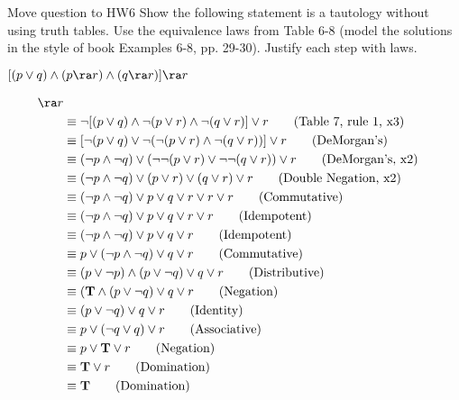 \begin{questions}


	
 {\color{red} Move question to HW6}
Show the following statement is a tautology without using truth tables. Use the equivalence laws from Table 6-8 (model the solutions in the style of book Examples 6-8, pp. 29-30).  Justify each step with laws.

\vspace{-0.15in}
\begin{center}
    $[(p \vee q) \wedge (p \ra r) \wedge (q \ra r)] \ra r$
\end{center}
\vspace{-10pt}

    \begin{solution}
    \begin{align*}
      [(p \vee q) &\wedge ((p \ra r) \wedge (q \ra r))] \ra r \\
      &\equiv \neg[(p \vee q) \wedge \neg(p \vee r) \wedge \neg (q \vee r)] \vee r \tag{Table 7, rule 1, x3} \\
      &\equiv [\neg(p \vee q) \vee \neg(\neg(p \vee r) \wedge \neg(q \vee r))] \vee r \tag{DeMorgan's} \\
      & \equiv (\neg p \wedge \neg q) \vee (\neg \neg(p \vee r) \vee \neg \neg(q \vee r)) \vee r \tag{DeMorgan's, x2} \\
      & \equiv (\neg p \wedge \neg q) \vee (p \vee r) \vee (q \vee r) \vee r \tag{Double Negation, x2} \\
      & \equiv (\neg p \wedge \neg q) \vee p \vee q \vee r \vee r \vee r \tag{Commutative} \\
      & \equiv (\neg p \wedge \neg q) \vee p \vee q \vee r \vee r \tag{Idempotent} \\
      & \equiv (\neg p \wedge \neg q) \vee p \vee q \vee r \tag{Idempotent} \\
      & \equiv p \vee (\neg p \wedge \neg q) \vee q \vee r \tag{Commutative} \\
      & \equiv (p \vee \neg p) \wedge (p \vee \neg q) \vee q \vee r \tag{Distributive} \\
      & \equiv (\mathbf{T} \wedge (p \vee \neg q) \vee q \vee r \tag{Negation} \\
      & \equiv (p \vee \neg q) \vee q \vee r \tag{Identity} \\
      & \equiv p \vee (\neg q \vee q) \vee r \tag{Associative} \\
      & \equiv p \vee \mathbf{T} \vee r \tag{Negation} \\
      & \equiv \mathbf{T} \vee r \tag{Domination} \\
      & \equiv \mathbf{T} \tag{Domination}
    \end{align*}


\end{solution}
\end{questions}
